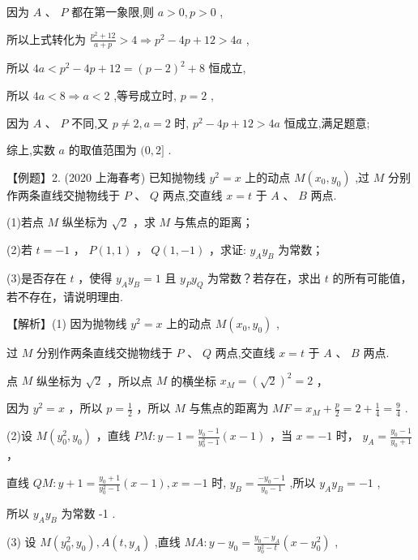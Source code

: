 \documentclass[10pt]{article}
\begin{document}
因为 \(A\text{ 、 }P\) 都在第一象限,则 \(a > 0,p > 0\) ,

所以上式转化为 \(\frac{{p}^{2} + {12}}{a + p} > 4 \Rightarrow  {p}^{2} - {4p} + {12} > {4a}\) ,

所以 \({4a} < {p}^{2} - {4p} + {12} = {\left( p - 2\right) }^{2} + 8\) 恒成立,

所以 \({4a} < 8 \Rightarrow  a < 2\) ,等号成立时, \(p = 2\) ,

因为 \(A\text{ 、 }P\) 不同,又 \(p \neq  2,a = 2\) 时, \({p}^{2} - {4p} + {12} > {4a}\) 恒成立,满足题意;

综上,实数 \(a\) 的取值范围为 \((0,2\rbrack\) .

【例题】2. (2020 上海春考) 已知抛物线 \({y}^{2} = x\) 上的动点 \(M\left( {{x}_{0},{y}_{0}}\right)\) ,过 \(M\) 分别作两条直线交抛物线于 \(P\text{ 、 }Q\) 两点,交直线 \(x = t\) 于 \(A\text{ 、 }B\) 两点.

(1)若点 \(M\) 纵坐标为 \(\sqrt{2}\) ，求 \(M\) 与焦点的距离；

(2)若 \(t =  - 1\) ， \(P\left( {1,1}\right)\) ， \(Q\left( {1, - 1}\right)\) ，求证: \({y}_{A}{y}_{B}\) 为常数；

(3)是否存在 \(t\) ，使得 \({y}_{A}{y}_{B} = 1\) 且 \({y}_{P}{y}_{Q}\) 为常数？若存在，求出 \(t\) 的所有可能值，若不存在，请说明理由.

【解析】(1) 因为抛物线 \({y}^{2} = x\) 上的动点 \(M\left( {{x}_{0},{y}_{0}}\right)\) ,

过 \(M\) 分别作两条直线交抛物线于 \(P\text{ 、 }Q\) 两点,交直线 \(x = t\) 于 \(A\text{ 、 }B\) 两点.

点 \(M\) 纵坐标为 \(\sqrt{2}\) ，所以点 \(M\) 的横坐标 \({x}_{M} = {\left( \sqrt{2}\right) }^{2} = 2\) ，

因为 \({y}^{2} = x\) ，所以 \(p = \frac{1}{2}\) ，所以 \(M\) 与焦点的距离为 \({MF} = {x}_{M} + \frac{p}{2} = 2 + \frac{1}{4} = \frac{9}{4}\) .

(2)设 \(M\left( {{y}_{0}^{2},{y}_{0}}\right)\) ，直线 \({PM} : y - 1 = \frac{{y}_{0} - 1}{{y}_{0}^{2} - 1}\left( {x - 1}\right)\) ，当 \(x =  - 1\) 时， \({y}_{A} = \frac{{y}_{0} - 1}{{y}_{0} + 1}\) ，

直线 \({QM} : y + 1 = \frac{{y}_{0} + 1}{{y}_{0}^{2} - 1}\left( {x - 1}\right) ,x =  - 1\) 时, \({y}_{B} = \frac{-{y}_{0} - 1}{{y}_{0} - 1}\) ,所以 \({y}_{A}{y}_{B} =  - 1\) ,

所以 \({y}_{A}{y}_{B}\) 为常数 -1 .

(3) 设 \(M\left( {{y}_{0}^{2},{y}_{0}}\right) ,A\left( {t,{y}_{A}}\right)\) ,直线 \({MA} : y - {y}_{0} = \frac{{y}_{0} - {y}_{A}}{{y}_{0}^{2} - t}\left( {x - {y}_{0}^{2}}\right)\) ,
\end{document}
